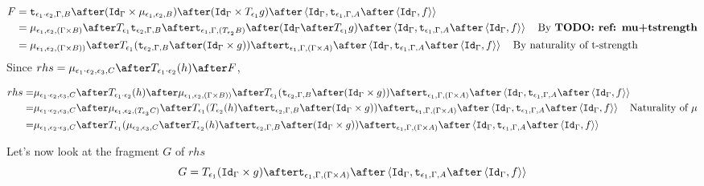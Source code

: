 {    \begin{equation}
        \begin{split}
            F & = \tstrength{\e_1\dot\e_2}{\G}{B}\after(\idg\times\bind{\e_1}{\e_2}{B})\after(\idg\times\T{\e_1}{g})\after\pr{\idg}{\tstrength{\e_1}{\G}{A}\after\pr{\idg}{f}}\\
            &  = \bind{\e_1}{\e_2}{(\G\times B)} \after \T{\e_1}{\tstrength{\e_2}{\G}{B}} \after\tstrength{\e_1}{\G}{(\T{\e_2}{B})} \after (\idg \after\T{\e_1}{g})\after\pr{\idg}{\tstrength{\e_1}{\G}{A}\after\pr{\idg}{f}}\qt{By \todo{ref: mu+tstrength}}
            \\ & = \bind{\e_1}{\e_2}{(\G \times B))} \after \T{\e_1}{(\tstrength{\e_2}{\G}{B} \after (\idg \times g))} \after \tstrength{\e_1}{\G}{(\G \times A)} \after \pr{\idg}{\tstrength{\e_1}{\G}{A}\after\pr{\idg}{f}}\qt{By naturality of t-strength}
        \end{split}
    \end{equation}
    Since
    $
        rhs = \bind{\e_1\dot\e_2}{\e_3}{C}\after\T{\e_1\dot\e_2}{(h)}\after F
    $, 

    \begin{equation}
        \begin{split}
            rhs = &\bind{\e_1\dot\e_2}{\e_3}{C}\after\T{\e_1\dot\e_2}{(h)}\after\bind{\e_1}{\e_2}{(\G \times B))} \after \T{\e_1}{(\tstrength{\e_2}{\G}{B} \after (\idg \times g))} \after \tstrength{\e_1}{\G}{(\G \times A)} \after \pr{\idg}{\tstrength{\e_1}{\G}{A}\after\pr{\idg}{f}}\\
            = &\bind{\e_1\dot\e_2}{\e_3}{C}\after\bind{\e_1}{\e_2}{(\T{\e_3}{C})}\after\T{\e_1}{(\T{\e_2}{(h)} \after \tstrength{\e_2}{\G}{B} \after (\idg \times g))} \after \tstrength{\e_1}{\G}{(\G \times A)} \after \pr{\idg}{\tstrength{\e_1}{\G}{A}\after\pr{\idg}{f}}\qt{Naturality of $\mu$}\\
            = & \bind{\e_1}{\e_2\dot\e_3}{C}\after\T{\e_1}{(\bind{\e_2}{\e_3}{C}\after \T{\e_2}{(h)} \after \tstrength{\e_2}{\G}{B} \after (\idg \times g))} \after \tstrength{\e_1}{\G}{(\G \times A)} \after \pr{\idg}{\tstrength{\e_1}{\G}{A}\after\pr{\idg}{f}}
        \end{split}
    \end{equation}

    Let's now look at the fragment $G$ of $rhs$
    \begin{equation}
        G = \T{\e_1}{(\idg\times g)}\after\tstrength{\e_1}{\G}{(\G\times A)}\after\pr{\idg}{\tstrength{\e_1}{\G}{A}\after\pr{\idg}{f}}
    \end{equation}

}
